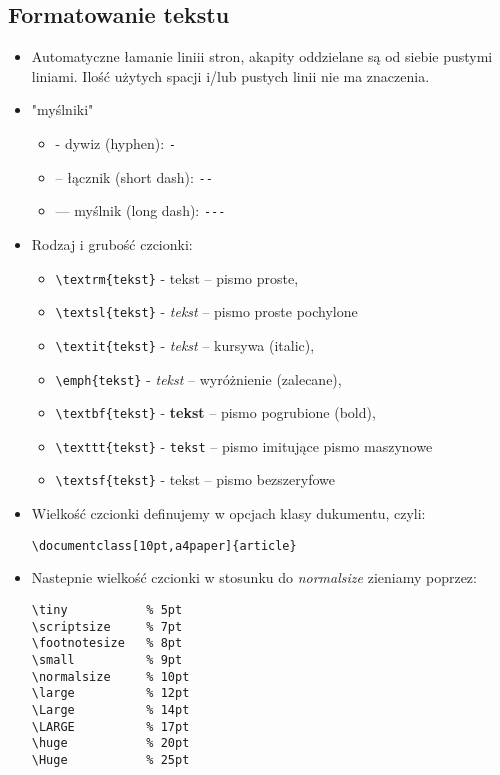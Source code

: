 \subsection{Formatowanie tekstu} 

\begin{itemize}
\item Automatyczne łamanie liniii stron, akapity oddzielane są od siebie pustymi liniami. Ilość użytych spacji i/lub pustych linii nie ma znaczenia.
\item "myślniki"
\begin{itemize}
    \item - dywiz (hyphen): \verb|-|
    \item -- łącznik (short dash): \verb|--|
    \item --- myślnik (long dash): \verb|---|
\end{itemize}
\item Rodzaj i grubość czcionki:
\begin{itemize}
    \item \verb|\textrm{tekst}| - \textrm{tekst} – pismo proste,
    \item \verb|\textsl{tekst}| - \textsl{tekst} – pismo proste pochylone
    \item \verb|\textit{tekst}| - \textit{tekst} – kursywa (italic),
    \item \verb|\emph{tekst}|   - \emph{tekst}    – wyróżnienie (zalecane),
    \item \verb|\textbf{tekst}| - \textbf{tekst} – pismo pogrubione (bold),
    \item \verb|\texttt{tekst}| - \texttt{tekst} – pismo imitujące pismo maszynowe
    \item \verb|\textsf{tekst}| - \textsf{tekst} – pismo bezszeryfowe
\end{itemize}
\item Wielkość czcionki definujemy w opcjach klasy dukumentu, czyli:
\begin{verbatim}
\documentclass[10pt,a4paper]{article}
\end{verbatim}
\item Nastepnie wielkość czcionki w stosunku do \emph{normalsize} zieniamy poprzez:
\begin{verbatim}
\tiny           % 5pt
\scriptsize     % 7pt
\footnotesize   % 8pt
\small          % 9pt
\normalsize     % 10pt
\large          % 12pt
\Large          % 14pt
\LARGE          % 17pt
\huge           % 20pt
\Huge           % 25pt
\end{verbatim}
\end{itemize}
